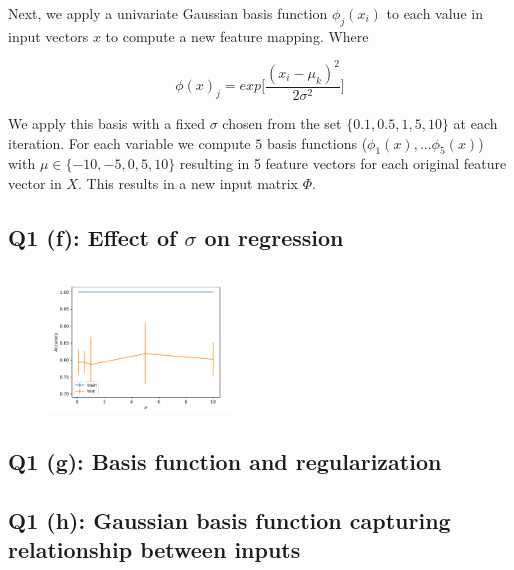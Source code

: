 \documentclass[11pt]{amsart}
\begin{document}
Next, we apply a univariate Gaussian basis function $\phi_j(x_i)$ to each value in input vectors $x$ to compute a new feature mapping. Where

\begin{equation}
	\phi(x)_j = exp\bigg[{\frac{(x_i - \mu_k)^2}{2\sigma^2}}\bigg]
\end{equation}

We apply this basis with a fixed $\sigma$ chosen from the set $\{0.1, 0.5, 1, 5, 10\}$ at each iteration. For each variable we compute $5$ basis functions ($\phi_{1}(x), ... \phi_{5}(x)$) with $\mu \in \{-10, -5, 0, 5, 10\}$ resulting in 5 feature vectors for each original feature vector in $X$. This results in a new input matrix $\Phi$.

\subsection{Q1 (f): Effect of $\sigma$ on regression}

\begin{figure}
	\centering
	\includegraphics[width=0.45\textwidth]{sigmas.pdf}
\end{figure}

\subsection{Q1 (g): Basis function and regularization}

%

\subsection{Q1 (h): Gaussian basis function capturing relationship between inputs}
\end{document}
